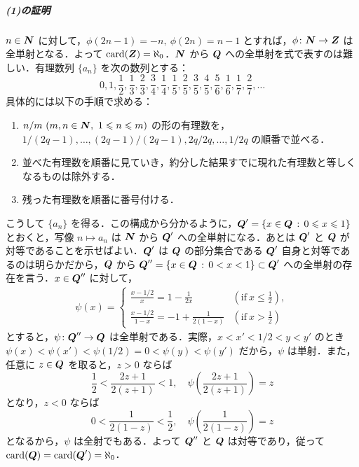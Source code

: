 \documentclass[pandoc,base=10pt,b5j,precisetext]{bxjsarticle}
\providecommand{\tightlist}{%
  \setlength{\itemsep}{0pt}\setlength{\parskip}{0pt}}
\let\oldsubparagraph\subparagraph
\renewcommand{\subparagraph}[1]{\oldsubparagraph{#1}\mbox{}}
\def\lt{<}
\def\gt{>}
\begin{document}
\hypertarget{ux306eux8a3cux660e}{%
\subparagraph{(1)の証明}\label{ux306eux8a3cux660e}}

\(n \in \boldsymbol{N}\) に対して，\(\phi(2n - 1) = -n,\ \phi(2n) = n - 1\)
とすれば，\(\phi \colon \boldsymbol{N} \to \boldsymbol{Z}\) は全単射となる．よって
\(\mathop{\mathrm{card}}\nolimits(\boldsymbol{Z}) = \aleph_0\)．\(\boldsymbol{N}\) から \(\boldsymbol{Q}\)
への全単射を式で表すのは難しい．有理数列 \(\{ a_n \}\)
を次の数列とする： \[
0, 1, \frac 12,  \frac 13, \frac 23, \frac 34, \frac 14, \frac 15, \frac 25, \frac 35, \frac 45, \frac 56, \frac 16, \frac 17, \frac 27, \dotsc
\] 具体的には以下の手順で求める：

\begin{enumerate}
\def\labelenumi{\arabic{enumi}.}
\tightlist
\item
  \(n/m\ (m, n \in \boldsymbol{N},\ 1 \leqslant n \leqslant m)\)
  の形の有理数を，\(1 / (2q - 1), \dotsc, (2q - 1) / (2q - 1), 2q / 2q, \dotsc, 1 / 2q\)
  の順番で並べる．
\item
  並べた有理数を順番に見ていき，約分した結果すでに現れた有理数と等しくなるものは除外する．
\item
  残った有理数を順番に番号付ける．
\end{enumerate}

こうして \(\{ a_n \}\)
を得る．この構成から分かるように，\(\boldsymbol{Q}' = \{ x \in \boldsymbol{Q} \,:\, 0 \leqslant x \leqslant 1 \}\)
とおくと，写像 \(n \mapsto a_n\) は \(\boldsymbol{N}\) から \(\boldsymbol{Q}'\)
への全単射になる．あとは \(\boldsymbol{Q}'\) と \(\boldsymbol{Q}\)
が対等であることを示せばよい．\(\boldsymbol{Q}'\) は \(\boldsymbol{Q}\) の部分集合である
\(\boldsymbol{Q}'\) 自身と対等であるのは明らかだから，\(\boldsymbol{Q}\) から
\(\bb Q'' = \{ x \in \bb Q \deli 0 \lt x \lt 1 \} \subset \bb Q'\)
への全単射の存在を言う．\(x \in \boldsymbol{Q}''\) に対して， \begin{align*}
\psi(x) = \left\{ \begin{array}{ll} \frac{x - 1/2}x = 1 - \frac 1{2x} & (\text{if}\ x \le \frac 12),\\
\frac{x - 1/2}{1 - x} = -1 + \frac 1{2(1 - x)} & (\text{if}\ x \gt \frac 12) \end{array} \right.
\end{align*} とすると，\(\psi \colon \boldsymbol{Q}'' \to \boldsymbol{Q}\)
は全単射である．実際，\(x \lt x' \lt 1/2 \lt y \lt y'\) のとき
\(\psi(x) \lt \psi(x') \lt \psi(1/2) = 0 \lt \psi(y) \lt \psi(y')\)
だから，\(\psi\) は単射．また，任意に \(z \in \boldsymbol{Q}\)
を取ると，\(z \gt 0\) ならば \[
\frac 12 \lt \frac{2z + 1}{2(z + 1)} \lt 1,\quad \psi\left( \frac{2z + 1}{2(z + 1)} \right) = z
\] となり，\(z \lt 0\) ならば \[
0 \lt \frac 1{2(1 - z)} \lt \frac 12,\quad \psi\left( \frac 1{2(1 - z)} \right) = z
\] となるから，\(\psi\) は全射でもある．よって \(\boldsymbol{Q}''\) と \(\boldsymbol{Q}\)
は対等であり，従って \(\mathop{\mathrm{card}}\nolimits(\boldsymbol{Q}) = \mathop{\mathrm{card}}\nolimits(\boldsymbol{Q}') = \aleph_0\)．
\end{document}
